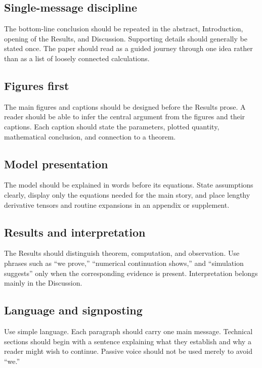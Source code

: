 \documentclass[11pt, reqno]{amsart}
\theoremstyle{definition}
\theoremstyle{remark}
\begin{document}
	\subsection{Single-message discipline}
	
	The bottom-line conclusion should be repeated in the abstract, Introduction,
	opening of the Results, and Discussion.  Supporting details should generally be
	stated once.  The paper should read as a guided journey through one idea rather
	than as a list of loosely connected calculations.
	
	\subsection{Figures first}
	
	The main figures and captions should be designed before the Results prose.  A
	reader should be able to infer the central argument from the figures and their
	captions.  Each caption should state the parameters, plotted quantity,
	mathematical conclusion, and connection to a theorem.
	
	\subsection{Model presentation}
	
	The model should be explained in words before its equations.  State assumptions
	clearly, display only the equations needed for the main story, and place
	lengthy derivative tensors and routine expansions in an appendix or supplement.
	
	\subsection{Results and interpretation}
	
	The Results should distinguish theorem, computation, and observation.  Use
	phrases such as ``we prove,'' ``numerical continuation shows,'' and ``simulation
	suggests'' only when the corresponding evidence is present.  Interpretation
	belongs mainly in the Discussion.
	
	\subsection{Language and signposting}
	
	Use simple language.  Each paragraph should carry one main message.  Technical
	sections should begin with a sentence explaining what they establish and why a
	reader might wish to continue.  Passive voice should not be used merely to
	avoid ``we.''
	
\end{document}
